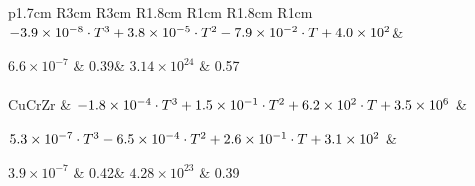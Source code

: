 \begin{table}
\begin{tabular}{p{1.7cm}  R{3cm}  R{3cm}  R{1.8cm}  R{1cm} R{1.8cm}  R{1cm}}
        $-3.9\times 10^{-8}\cdot T^3\newline %
        +3.8\times 10^{-5}\cdot T^2\newline %
        -7.9\times 10^{-2}\cdot T\newline %
        +4.0\times 10^2 $&%

        $6.6\times 10^{-7}$ &%
        0.39&%
        $3.14\times 10^{24}$ & 0.57\\
        \\
        CuCrZr \cite{serra_hydrogen_1998}& %
        $-1.8\times 10^{-4}\cdot T^3 \newline %
        +1.5\times 10^{-1}\cdot T^2\newline %
        +6.2\times 10^2\cdot T\newline %
        +3.5\times 10^6$ &%

        $5.3\times 10^{-7}\cdot T^3\newline %
        -6.5\times 10^{-4}\cdot T^2\newline %
        +2.6\times 10^{-1}\cdot T\newline %
        +3.1\times 10^2$ & %

        $3.9\times 10^{-7}$ & %
        0.42&%
        $4.28\times 10^{23}$ & 0.39\\
        \\
        \\
    \end{tabular}
    \caption{Materials properties used in the simulations. Thermal properties are fitted from ANSYS.}
    \label{tab:materials properties monoblock}
\end{table}

